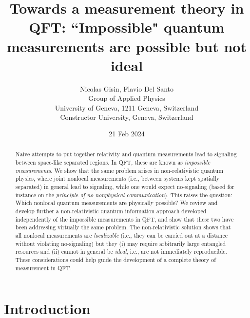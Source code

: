 \documentclass[12pt]{article}
\begin{document}
\title{\Large Towards a measurement theory in QFT: ``Impossible" quantum measurements are possible but not ideal}

\author{Nicolas Gisin,
Flavio Del Santo \\
Group of Applied Physics\\ University of Geneva, 1211 Geneva, Switzerland\\
Constructor University, Geneva, Switzerland}

\date{21 Feb 2024}

\maketitle

\begin{abstract}
\noindent 
Naive attempts to put together relativity and quantum measurements 
lead to signaling between space-like separated regions. In QFT, these are known as \textit{impossible measurements}. We show that the same problem arises in non-relativistic quantum physics, where joint nonlocal measurements (i.e., between systems kept spatially separated) in general lead to signaling, while one would expect no-signaling (based for instance on the \textit{principle of no-nonphysical communication}). This raises the question: Which nonlocal quantum measurements are physically possible? We review and develop further a non-relativistic quantum information approach developed independently of the impossible measurements in QFT, and show that these two have been addressing virtually the same problem. The non-relativistic solution shows that all nonlocal measurements are \textit{localizable} (i.e., they can be carried out at a distance without violating no-signaling) but they (i)  may require arbitrarily large entangled resources and (ii)  cannot in general be \textit{ideal}, i.e., are not immediately reproducible. These considerations could help guide the development of a complete theory of measurement in QFT.

\end{abstract}





\section{Introduction}
\label{intro}
\end{document}
